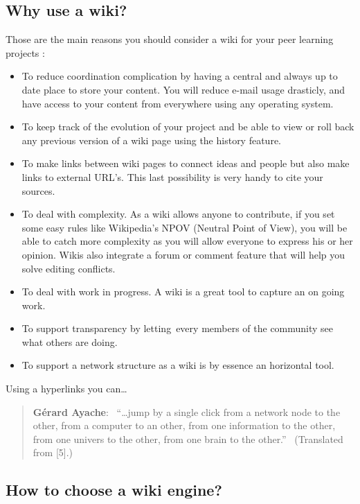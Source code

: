\subsection{Why use a wiki?}\label{why-use-a-wiki}

Those are the main reasons you should consider a wiki for your peer
learning projects :

\begin{itemize}
\itemsep1pt\parskip0pt
\item
  To reduce coordination complication by having a central and always up
  to date place to store your content. You will reduce e-mail usage
  drasticly, and have access to your content from everywhere using any
  operating system.
\item
  To keep track of the evolution of your project and be able to view or
  roll back any previous version of a wiki page using the history
  feature.
\item
  To make links between wiki pages to connect ideas and people but also
  make links to external URL's. This last possibility is very handy to
  cite your sources.
\item
  To deal with complexity. As a wiki allows anyone to contribute, if you
  set some easy rules like Wikipedia's NPOV (Neutral Point of View), you
  will be able to catch more complexity as you will allow everyone to
  express his or her opinion. Wikis also integrate a forum or comment
  feature that will help you solve editing conflicts.
\item
  To deal with work in progress. A wiki is a great tool to capture an on
  going work.
\item
  To support transparency by letting~every members of the community see
  what others are doing.
\item
  To support a network structure as a wiki is by essence an horizontal
  tool.
\end{itemize}

Using a hyperlinks you can\ldots{}

\begin{quote}
\textbf{Gérard Ayache}:~ ``\ldots{}jump by a single click from a network
node to the other, from a computer to an other, from one information to
the other, from one univers to the other, from one brain to the
other.''~ (Translated from {{[}5{]}}.)
\end{quote}

\subsection{How to choose a wiki
engine?}\label{how-to-choose-a-wiki-engine}

